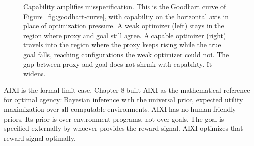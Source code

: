 \begin{figure}[h]
\centering
{}
\caption{Capability amplifies misspecification. This is the Goodhart curve of Figure~\ref{fig:goodhart-curve}, with capability on the horizontal axis in place of optimization pressure. A weak optimizer (left) stays in the region where proxy and goal still agree. A capable optimizer (right) travels into the region where the proxy keeps rising while the true goal falls, reaching configurations the weak optimizer could not. The gap between proxy and goal does not shrink with capability. It widens.}
\label{fig:capability-amplifies}
\end{figure}

AIXI is the formal limit case. Chapter 8 built AIXI as the mathematical reference for optimal agency: Bayesian inference with the universal prior, expected utility maximization over all computable environments. AIXI has no human-friendly priors. Its prior is over environment-programs, not over goals. The goal is specified externally by whoever provides the reward signal. AIXI optimizes that reward signal optimally.

